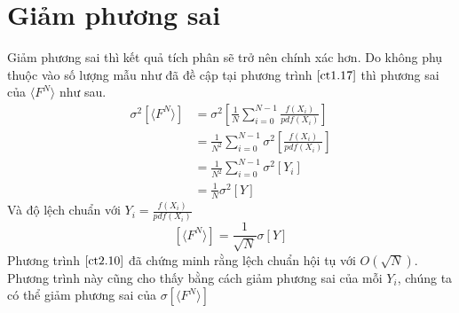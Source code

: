 \section{Giảm phương sai}\label{sec:2.4}
Giảm phương sai thì kết quả tích phân sẽ trở nên chính xác hơn. Do không phụ thuộc vào số lượng mẫu như đã đề cập tại phương trình $ \ref{ct1.17} $ thì phương sai của $\langle{F^N}\rangle$ như sau.
\begin{equation} 
	\begin{split}
		{\sigma}^2{\left[\langle{F^N}\rangle\right]}&={\sigma}^2\left[{\frac{1}{N}\sum_{i=0}^{N-1}\frac{{f(X_i)}}{pdf(X_i)}}\right] \\
										 & = \frac{1}{N^2}\sum_{i=0}^{N-1}{\sigma}^2\left[{\frac{{f(X_i)}}{pdf(X_i)}}\right]\\
										 & = \frac{1}{N^2}\sum_{i=0}^{N-1}{\sigma}^2\left[Y_i\right]\\
										 & = \frac{1}{N}{\sigma}^2\left[Y\right]
	\end{split}
\end{equation}
Và độ lệch chuẩn với $Y_i=\frac{f(X_i)}{pdf(X_i)}$ 
\begin{equation}
	\left[\langle{F^N}\rangle\right]=\frac{1}{\sqrt{N}}\sigma[Y]\label{ct2.10}
\end{equation}
Phương trình $ \ref{ct2.10} $ đã chứng minh rằng lệch chuẩn hội tụ với $O(\sqrt{N})$. 
Phương trình này cũng cho thấy bằng cách giảm phương sai của mỗi $Y_i$, chúng ta có thể giảm phương sai của ${\sigma}{\left[\langle{F^N}\rangle\right]}$
